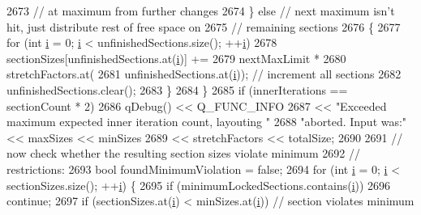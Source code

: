 \begin{DoxyCode}
2673                                               \textcolor{comment}{// at maximum from further changes}
2674       \} \textcolor{keywordflow}{else} \textcolor{comment}{// next maximum isn't hit, just distribute rest of free space on}
2675              \textcolor{comment}{// remaining sections}
2676       \{
2677         \textcolor{keywordflow}{for} (\textcolor{keywordtype}{int} \hyperlink{_comparision_pictures_2_createtest_image_8m_a6f6ccfcf58b31cb6412107d9d5281426}{i} = 0; \hyperlink{_comparision_pictures_2_createtest_image_8m_a6f6ccfcf58b31cb6412107d9d5281426}{i} < unfinishedSections.size(); ++\hyperlink{_comparision_pictures_2_createtest_image_8m_a6f6ccfcf58b31cb6412107d9d5281426}{i})
2678           sectionSizes[unfinishedSections.at(\hyperlink{_comparision_pictures_2_createtest_image_8m_a6f6ccfcf58b31cb6412107d9d5281426}{i})] +=
2679               nextMaxLimit *
2680               stretchFactors.at(
2681                   unfinishedSections.at(\hyperlink{_comparision_pictures_2_createtest_image_8m_a6f6ccfcf58b31cb6412107d9d5281426}{i})); \textcolor{comment}{// increment all sections}
2682         unfinishedSections.clear();
2683       \}
2684     \}
2685     \textcolor{keywordflow}{if} (innerIterations == sectionCount * 2)
2686       qDebug() << Q\_FUNC\_INFO
2687                << \textcolor{stringliteral}{"Exceeded maximum expected inner iteration count, layouting "}
2688                   \textcolor{stringliteral}{"aborted. Input was:"} << maxSizes << minSizes
2689                << stretchFactors << totalSize;
2690 
2691     \textcolor{comment}{// now check whether the resulting section sizes violate minimum}
2692     \textcolor{comment}{// restrictions:}
2693     \textcolor{keywordtype}{bool} foundMinimumViolation = \textcolor{keyword}{false};
2694     \textcolor{keywordflow}{for} (\textcolor{keywordtype}{int} \hyperlink{_comparision_pictures_2_createtest_image_8m_a6f6ccfcf58b31cb6412107d9d5281426}{i} = 0; \hyperlink{_comparision_pictures_2_createtest_image_8m_a6f6ccfcf58b31cb6412107d9d5281426}{i} < sectionSizes.size(); ++\hyperlink{_comparision_pictures_2_createtest_image_8m_a6f6ccfcf58b31cb6412107d9d5281426}{i}) \{
2695       \textcolor{keywordflow}{if} (minimumLockedSections.contains(\hyperlink{_comparision_pictures_2_createtest_image_8m_a6f6ccfcf58b31cb6412107d9d5281426}{i}))
2696         \textcolor{keywordflow}{continue};
2697       \textcolor{keywordflow}{if} (sectionSizes.at(\hyperlink{_comparision_pictures_2_createtest_image_8m_a6f6ccfcf58b31cb6412107d9d5281426}{i}) < minSizes.at(\hyperlink{_comparision_pictures_2_createtest_image_8m_a6f6ccfcf58b31cb6412107d9d5281426}{i})) \textcolor{comment}{// section violates minimum}

\end{DoxyCode}
